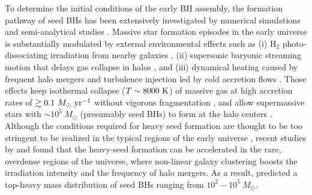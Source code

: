 \documentclass[twocolumn, twocolappendix]{aastex63}
\newcommand{\Msun}{M_\odot}
\newcommand{\Msunyr}{M_\odot~{\rm yr}^{-1}}
\begin{document}
\begin{CJK*}{UTF8}{gbsn}
To determine the initial conditions of the early BH assembly,
the formation pathway of seed BHs has been extensively investigated by numerical simulations and semi-analytical studies
\citep{2006MNRAS.370..289B,2009ApJ...696.1798T,2012MNRAS.422.2051N,2014ApJ...781...60H,
2015MNRAS.448..568H,2018MNRAS.474.3825V,2021MNRAS.506..613S,2022arXiv220614459T,2022arXiv220505717B}.
Massive star formation episodes in the early universe is substantially modulated by external environmental effects such as
(i) H$_2$ photo-dissociating irradiation from nearby galaxies
\citep{2001ApJ...546..635O,2002ApJ...569..558O,2003Natur.425..812B,2010MNRAS.402.1249S,2014MNRAS.445..544S,2014MNRAS.445..107V,2016ApJ...832..134C},
(ii) supersonic baryonic streaming motion that delays gas collapse in halos
\citep{2012MNRAS.424.1335F, 2014MNRAS.439.1092T, 2018ApJ...855...17H,2017MNRAS.471.4878S,2018MNRAS.479.4017I},
and (iii) dynamical heating caused by frequent halo mergers and turbulence injection led by cold accretion flows
\citep{2003ApJ...592..645Y,2010Natur.466.1082M,2015ApJ...810...51M,2019Natur.566...85W,2022Natur.607...48L}.
Those effects keep isothermal collapse ($T\sim 8000~{\rm K}$) of massive gas at high accretion rates of $\gtrsim 0.1~\Msunyr$
without vigorous fragmentation \citep{2014MNRAS.445L.109I,2015MNRAS.446.2380B,2016PASA...33...51L},
and allow supermassive stars with $\sim 10^5~\Msun$ (presumably seed BHs) to form at the halo centers 
\citep{2013ApJ...778..178H,2013A&A...558A..59S,2019PASA...36...27W,2022arXiv220614459T}.
Although the conditions required for heavy seed formation are thought to be too stringent to be realized in the typical regions of the early universe
\citep{2008MNRAS.391.1961D,2009ApJ...695.1430A,2015MNRAS.450.4350I},
recent studies by \citet{2021MNRAS.503.5046L} and \citet{2021ApJ...917...60L} found that the heavy-seed formation
can be accelerated in the rare, overdense regions of the universe, where non-linear galaxy clustering boosts the irradiation intensity
and the frequency of halo mergers.
As a result, \citet{2021ApJ...917...60L} predicted a top-heavy mass distribution of seed BHs ranging from $10^2-10^5~\Msun$.



\end{CJK*}
\end{document}
